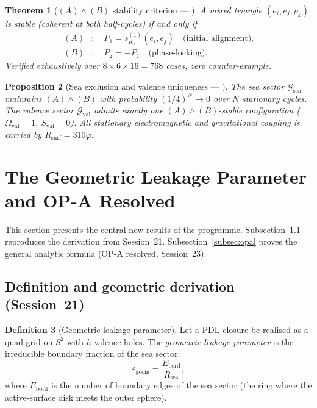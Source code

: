 \documentclass[12pt,a4paper]{article}
\theoremstyle{plain}
\newtheorem{theorem}{Theorem}[section]
\newtheorem{proposition}[theorem]{Proposition}
\theoremstyle{definition}
\newtheorem{definition}[theorem]{Definition}
\theoremstyle{remark}
\newcommand{\Kfour}{K_4}
\newcommand{\vp}{\varphi}
\newcommand{\Rsea}{R_{\mathrm{sea}}}
\newcommand{\Rsurf}{R_{\mathrm{surf}}}
\newcommand{\Gval}{\mathcal{G}_{\mathrm{val}}}
\newcommand{\Gsea}{\mathcal{G}_{\mathrm{sea}}}
\newcommand{\egeom}{\varepsilon_{\mathrm{geom}}}
\begin{document}
\begin{theorem}[$(A)\wedge(B)$ stability criterion --- \citep{D29}]
\label{thm:AB}
A mixed triangle $(e_i,e_j,p_k)$ is stable (coherent at both half-cycles) if and only if
\begin{align*}
(A)&:\quad P_1 = s_{\Kfour}^{(1)}(e_i,e_j)\quad\text{(initial alignment),}\\
(B)&:\quad P_2 = -P_1\quad\text{(phase-locking).}
\end{align*}
Verified exhaustively over $8\times 6\times 16=768$ cases, zero counter-example.
\end{theorem}

\begin{proposition}[Sea exclusion and valence uniqueness --- \citep{D29,D36}]
\label{prop:sea}
The sea sector $\Gsea$ maintains $(A)\wedge(B)$ with probability $(1/4)^N\to 0$ over $N$ stationary cycles. The valence sector $\Gval$ admits exactly one $(A)\wedge(B)$-stable configuration ($\Omega_{\mathrm{val}}=1$, $S_{\mathrm{val}}=0$). All stationary electromagnetic and gravitational coupling is carried by $\Rsurf=310\vp$.
\end{proposition}

\section{The Geometric Leakage Parameter and OP-A Resolved}
\label{sec:egeom}

This section presents the central new results of the programme. Subsection~\ref{subsec:egeom_v1} reproduces the derivation from Session~21. Subsection~\ref{subsec:opa} proves the general analytic formula (OP-A resolved, Session~23).

\subsection{Definition and geometric derivation (Session~21)}
\label{subsec:egeom_v1}

\begin{definition}[Geometric leakage parameter]
\label{def:egeom}
Let a PDL closure be realised as a quad-grid on $S^2$ with $h$ valence holes. The \emph{geometric leakage parameter} is the irreducible boundary fraction of the sea sector:
\[
\egeom = \frac{E_{\mathrm{bord}}}{\Rsea},
\]
where $E_{\mathrm{bord}}$ is the number of boundary edges of the sea sector (the ring where the active-surface disk meets the outer sphere).
\end{definition}
\end{document}
